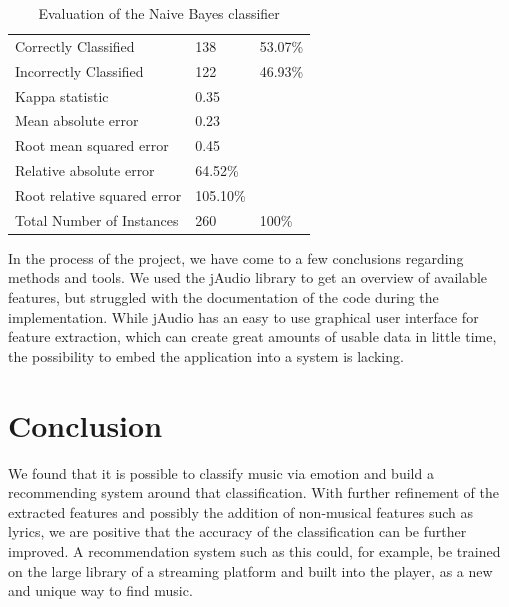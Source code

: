 \documentclass{sigchi-ext}
\begin{document}
\begin{table}
  \centering
  \begin{tabular}{@{}lll@{}}
    Correctly Classified          & 138       & 53.07\% \\
    Incorrectly Classified        & 122       & 46.93\% \\
    Kappa statistic 				      & 0.35      & \\
    Mean absolute error  			    & 0.23      & \\
    Root mean squared error 	    & 0.45      & \\
    Relative absolute error 	    & 64.52\%   & \\
    Root relative squared error   & 105.10\%  & \\
    Total Number of Instances     & 260       & 100\%
  \end{tabular}
  \caption{Evaluation of the Naive Bayes classifier}
\end{table}

In the process of the project, we have come to a few conclusions regarding methods and tools. We used the jAudio library to get an overview of available features, but struggled with the documentation of the code during the implementation. While jAudio has an easy to use graphical user interface for feature extraction, which can create great amounts of usable data in little time, the possibility to embed the application into a system is lacking.

\section{Conclusion}
We found that it is possible to classify music via emotion and build a recommending system around that classification. With further refinement of the extracted features and possibly the addition of non-musical features such as lyrics, we are positive that the accuracy of the classification can be further improved. A recommendation system such as this could, for example, be trained on the large library of a streaming platform and built into the player, as a new and unique way to find music.



\end{document}
